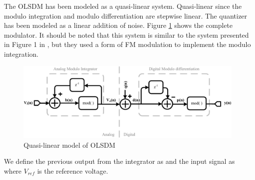 The OLSDM has been modeled as a quasi-linear system. Quasi-linear
since the modulo integration and modulo differentiation are stepwise linear.
The quantizer has been modeled as a linear addition of noise. Figure
\ref{p3fig:modolsd} shows the complete modulator. It should
be noted that this system is similar to the system presented in
Figure 1 in \cite{claasen80}, but they used a form of FM
modulation to implement the modulo integration. 

\begin{figure}[ht]
\centering 
 \includegraphics[width=\myfigwidth]{graphics/modolsd}
  \caption{Quasi-linear model of OLSDM}
  \label{p3fig:modolsd}
\end{figure}

We define the previous output from the integrator as
and the input signal as
where $V_{ref}$ is the reference voltage.

